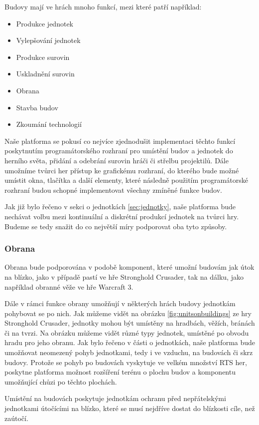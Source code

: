 Budovy mají ve hrách mnoho funkcí, mezi které patří například:
\begin{itemize}
	\item Produkce jednotek
	\item Vylepšování jednotek
	\item Produkce surovin
	\item Uskladnění surovin
	\item Obrana
	\item Stavba budov
	\item Zkoumání technologií
\end{itemize}


Naše platforma se pokusí co nejvíce zjednodušit implementaci těchto funkcí poskytnutím programátorského rozhraní pro umístění budov a jednotek do herního světa, přidání a odebrání surovin hráči či střelbu projektilů. Dále umožníme tvůrci her přístup ke grafickému rozhraní, do kterého bude možné umístit okna, tlačítka a další elementy, které následně použitím programátorské rozhraní budou schopné implementovat všechny zmíněné funkce budov.  

Jak již bylo řečeno v sekci o jednotkách \ref{sec:jednotky}, naše platforma bude nechávat volbu mezi kontinuální a diskrétní produkcí jednotek na tvůrci hry. Budeme se tedy snažit do co největší míry podporovat oba tyto způsoby. 

\subsubsection{Obrana}

Obrana bude podporována v podobě komponent, které umožní budovám jak útok na blízko, jako v případě pastí ve hře Stronghold Crusader, tak na dálku, jako například obranné věže ve hře Warcraft 3. 

Dále v rámci funkce obrany umožňují v některých hrách budovy jednotkám pohybovat se po nich. Jak můžeme vidět na obrázku \ref{fig:unitsonbuildings} ze hry Stronghold Crusader, jednotky mohou být umístěny na hradbách, věžích, bránách či na tvrzi. Na obrázku můžeme vidět různé typy jednotek, umístěné po obvodu hradu pro jeho obranu. Jak bylo řečeno v části o jednotkách, naše platforma bude umožňovat neomezený pohyb jednotkami, tedy i ve vzduchu, na budovách či skrz budovy. Protože se pohyb po budovách vyskytuje ve velkém množství RTS her, poskytne platforma možnost rozšíření terénu o plochu budov a komponentu umožňující chůzi po těchto plochách.

Umístění na budovách poskytuje jednotkám ochranu před nepřátelskými jednotkami útočícími na blízko, které se musí nejdříve dostat do blízkosti cíle, než zaútočí. 

